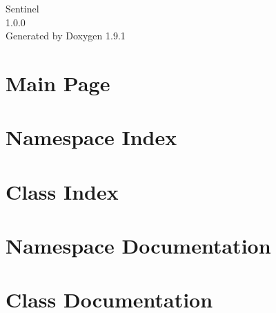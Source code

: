 \let\mypdfximage\pdfximage\def\pdfximage{\immediate\mypdfximage}\documentclass[twoside]{book}
\newcommand{\+}{\discretionary{\mbox{\scriptsize$\hookleftarrow$}}{}{}}
\newcommand{\clearemptydoublepage}{%
  \newpage{\pagestyle{empty}\cleardoublepage}%
}
\begin{document}
\raggedbottom

\hypersetup{pageanchor=false,
             bookmarksnumbered=true,
             pdfencoding=unicode
            }
\begin{titlepage}
\vspace*{7cm}
\begin{center}%
{\Large Sentinel \\[1ex]\large 1.\+0.\+0 }\\
\vspace*{1cm}
{\large Generated by Doxygen 1.9.1}\\
\end{center}
\end{titlepage}
\clearemptydoublepage
{}
\tableofcontents
\clearemptydoublepage
{}
\hypersetup{pageanchor=true}

\chapter{Main Page}
\label{index}\hypertarget{index}{}
\chapter{Namespace Index}

\chapter{Class Index}

\chapter{Namespace Documentation}

\chapter{Class Documentation}



\backmatter
\newpage
{}
\clearemptydoublepage
{}
\printindex
\end{document}
